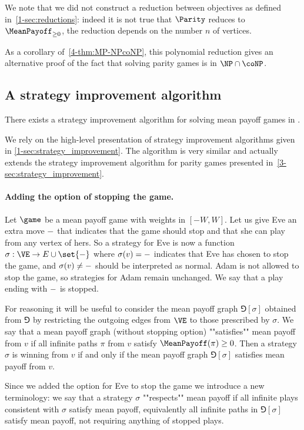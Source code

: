 We note that we did not construct a reduction between objectives as defined in~\cref{1-sec:reductions}:
indeed it is not true that $\Parity$ reduces to $\MeanPayoff_{\ge 0}$, the reduction depends on the number $n$ of vertices.

As a corollary of~\cref{4-thm:MP-NPcoNP}, this polynomial reduction gives an alternative proof of the fact
that solving parity games is in $\NP \cap \coNP$.

\subsection*{A strategy improvement algorithm}
\begin{theorem}
\label{4-thm:strategy_improvement}
There exists a strategy improvement algorithm for solving mean payoff games in .
\end{theorem}

We rely on the high-level presentation of strategy improvement algorithms given in \cref{1-sec:strategy_improvement}.
The algorithm is very similar and actually extends the strategy improvement algorithm for parity games presented in~\cref{3-sec:strategy_improvement}.

\paragraph{\bf Adding the option of stopping the game.}
Let $\game$ be a mean payoff game with weights in $[-W,W]$.
Let us give Eve an extra move $\mathtt{-}$ that indicates that the game should stop and that she can play from any vertex of hers.
So a strategy for Eve is now a function $\sigma : \VE \rightarrow E \cup \set{\siblank}$ 
where $\sigma(v) = \mathtt{-}$ indicates that Eve has chosen to stop the game, and $\sigma(v) \ne \mathtt{-}$ should be interpreted as normal.
Adam is not allowed to stop the game, so strategies for Adam remain unchanged.
We say that a play ending with $\mathtt{-}$ is stopped.

For reasoning it will be useful to consider the mean payoff graph $\Game[\sigma]$ obtained from $\Game$ by restricting the outgoing edges from $\VE$
to those prescribed by $\sigma$. 
We say that a mean payoff graph (without stopping option) ""satisfies"" mean payoff from $v$ if all infinite paths $\pi$ from $v$ satisfy 
$\MeanPayoff(\pi) \ge 0$.
Then a strategy $\sigma$ is winning from $v$ if and only if the mean payoff graph $\Game[\sigma]$ satisfies mean payoff from $v$.

Since we added the option for Eve to stop the game we introduce a new terminology: 
we say that a strategy $\sigma$ ""respects"" mean payoff if all infinite plays consistent with $\sigma$ satisfy mean payoff,
equivalently all infinite paths in $\Game[\sigma]$ satisfy mean payoff, not requiring anything of stopped plays.


